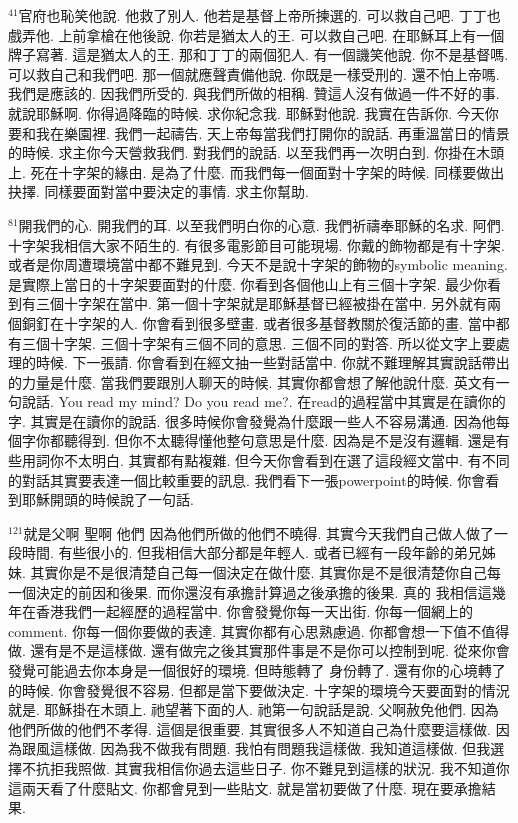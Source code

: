 \documentclass{book}
\begin{document}
$^{41}$官府也恥笑他說.
他救了別人.
他若是基督上帝所揀選的.
可以救自己吧.
丁丁也戲弄他.
上前拿槍在他後說.
你若是猶太人的王.
可以救自己吧.
在耶穌耳上有一個牌子寫著.
這是猶太人的王.
那和丁丁的兩個犯人.
有一個譏笑他說.
你不是基督嗎.
可以救自己和我們吧.
那一個就應聲責備他說.
你既是一樣受刑的.
還不怕上帝嗎.
我們是應該的.
因我們所受的.
與我們所做的相稱.
贊這人沒有做過一件不好的事.
就說耶穌啊.
你得過降臨的時候.
求你紀念我.
耶穌對他說.
我實在告訴你.
今天你要和我在樂園裡.
我們一起禱告.
天上帝每當我們打開你的說話.
再重溫當日的情景的時候.
求主你今天營救我們.
對我們的說話.
以至我們再一次明白到.
你掛在木頭上.
死在十字架的緣由.
是為了什麼.
而我們每一個面對十字架的時候.
同樣要做出抉擇.
同樣要面對當中要決定的事情.
求主你幫助.

$^{81}$開我們的心.
開我們的耳.
以至我們明白你的心意.
我們祈禱奉耶穌的名求.
阿們.
十字架我相信大家不陌生的.
有很多電影節目可能現場.
你戴的飾物都是有十字架.
或者是你周遭環境當中都不難見到.
今天不是說十字架的飾物的symbolic meaning.
是實際上當日的十字架要面對的什麼.
你看到各個他山上有三個十字架.
最少你看到有三個十字架在當中.
第一個十字架就是耶穌基督已經被掛在當中.
另外就有兩個銅釘在十字架的人.
你會看到很多壁畫.
或者很多基督教關於復活節的畫.
當中都有三個十字架.
三個十字架有三個不同的意思.
三個不同的對答.
所以從文字上要處理的時候.
下一張請.
你會看到在經文抽一些對話當中.
你就不難理解其實說話帶出的力量是什麼.
當我們要跟別人聊天的時候.
其實你都會想了解他說什麼.
英文有一句說話.
You read my mind? Do you read me?.
在read的過程當中其實是在讀你的字.
其實是在讀你的說話.
很多時候你會發覺為什麼跟一些人不容易溝通.
因為他每個字你都聽得到.
但你不太聽得懂他整句意思是什麼.
因為是不是沒有邏輯.
還是有些用詞你不太明白.
其實都有點複雜.
但今天你會看到在選了這段經文當中.
有不同的對話其實要表達一個比較重要的訊息.
我們看下一張powerpoint的時候.
你會看到耶穌開頭的時候說了一句話.

$^{121}$就是父啊 聖啊 他們 因為他們所做的他們不曉得.
其實今天我們自己做人做了一段時間.
有些很小的.
但我相信大部分都是年輕人.
或者已經有一段年齡的弟兄姊妹.
其實你是不是很清楚自己每一個決定在做什麼.
其實你是不是很清楚你自己每一個決定的前因和後果.
而你還沒有承擔計算過之後承擔的後果.
真的 我相信這幾年在香港我們一起經歷的過程當中.
你會發覺你每一天出街.
你每一個網上的comment.
你每一個你要做的表達.
其實你都有心思熟慮過.
你都會想一下值不值得做.
還有是不是這樣做.
還有做完之後其實那件事是不是你可以控制到呢.
從來你會發覺可能過去你本身是一個很好的環境.
但時態轉了 身份轉了.
還有你的心境轉了的時候.
你會發覺很不容易.
但都是當下要做決定.
十字架的環境今天要面對的情況就是.
耶穌掛在木頭上.
祂望著下面的人.
祂第一句說話是說.
父啊赦免他們.
因為他們所做的他們不孝得.
這個是很重要.
其實很多人不知道自己為什麼要這樣做.
因為跟風這樣做.
因為我不做我有問題.
我怕有問題我這樣做.
我知道這樣做.
但我選擇不抗拒我照做.
其實我相信你過去這些日子.
你不難見到這樣的狀況.
我不知道你這兩天看了什麼貼文.
你都會見到一些貼文.
就是當初要做了什麼.
現在要承擔結果.
\end{document}
